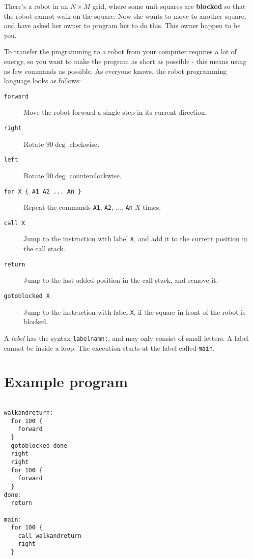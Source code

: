 
There's a robot in an $N \times M$ grid, where some unit squares are \textbf{blocked} so that the robot cannot walk on the square. Now she wants to move to another square, and have asked her owner to program her to do this.
This owner happen to be you.

To transfer the programming to a robot from your computer requires a lot of energy, so you want to make the program as short as possible - this means using as few commands as possible.
As everyone knows, the robot programming language looks as follows:

\begin{description}
  \item[\texttt{forward}] Move the robot forward a single step in its current direction.
  \item[\texttt{right}] Rotate $90\deg$ clockwise.
  \item[\texttt{left}] Rotate $90\deg$ counterclockwise.
  \item[\texttt{for X \{ A1 A2 ... An \}}] Repeat the commands \texttt{A1}, \texttt{A2}, ..., \texttt{An} $X$ times.
  \item[\texttt{call X}] Jump to the instruction with label \texttt{X}, and add it to the current position in the call stack.
  \item[\texttt{return}] Jump to the last added position in the call stack, and remove it.
  \item[\texttt{gotoblocked X}] Jump to the instruction with label \texttt{X}, if the square in front of the robot is blocked.
\end{description}

A \emph{label} has the syntax \texttt{labelnamn:}, and may only consist of small letters. A label cannot be inside a loop. The execution starts at the label called \texttt{main}.

\section*{Example program}

\begin{verbatim}

walkandreturn:
  for 100 {
    forward
  }
  gotoblocked done
  right
  right
  for 100 {
    forward
  }
done:
  return

main:
  for 100 {
    call walkandreturn
    right
  }
\end{verbatim}

